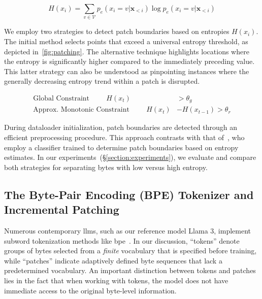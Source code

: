 \begin{equation}
H(x_i) = \sum_{v \in \mathcal{V}} p_{e}(x_i=v|\pmb{x}_{<i}) \log p_{e}(x_i=v|\pmb{x}_{<i})
\end{equation}

We employ two strategies to detect patch boundaries based on entropies $H(x_i)$. The initial method selects points that exceed a universal entropy threshold, as depicted in~\autoref{fig:patching}. The alternative technique highlights locations where the entropy is significantly higher compared to the immediately preceding value. This latter strategy can also be understood as pinpointing instances where the generally decreasing entropy trend within a patch is disrupted.

\begin{align*}
    \text{Global Constraint}\hspace{1cm}H(x_t)& > \theta_g\\
    \text{Approx. Monotonic Constraint}\hspace{1cm}H(x_t)& - H(x_{t-1}) > \theta_r
\end{align*}

During dataloader initialization, patch boundaries are detected through an efficient preprocessing procedure. This approach contrasts with that of~\citet{nawrot-etal-2023-efficient}, who employ a classifier trained to determine patch boundaries based on entropy estimates. In our experiments~(\S\ref{section:experiments}), we evaluate and compare both strategies for separating bytes with low versus high entropy.

\subsection{The Byte-Pair Encoding (BPE) Tokenizer and Incremental Patching}
\label{section:incremental-patching}
\label{section:bpe-patch}

Numerous contemporary llms, such as our reference model Llama 3, implement subword tokenization methods like bpe~\citep{gage1994new, sennrich-etal-2016-neural}. In our discussion, ``tokens'' denote groups of bytes selected from a \textit{finite} vocabulary that is specified before training, while ``patches'' indicate adaptively defined byte sequences that lack a predetermined vocabulary. An important distinction between tokens and patches lies in the fact that when working with tokens, the model does not have immediate access to the original byte-level information.

